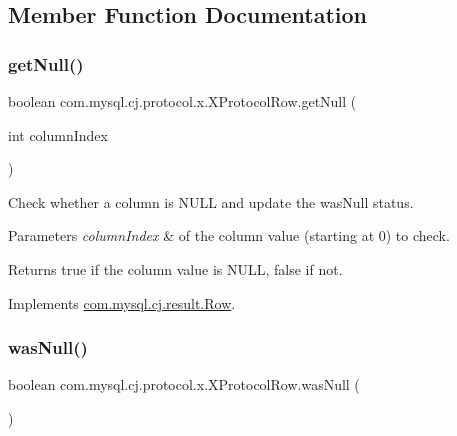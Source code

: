 \subsection{Member Function Documentation}
\mbox{\label{classcom_1_1mysql_1_1cj_1_1protocol_1_1x_1_1_x_protocol_row_adeaa06e6fee80085ce70902ed77ce16a}} 
\subsubsection{\texorpdfstring{get\+Null()}{getNull()}}
{\footnotesize\ttfamily boolean com.\+mysql.\+cj.\+protocol.\+x.\+X\+Protocol\+Row.\+get\+Null (\begin{DoxyParamCaption}\item[{int}]{column\+Index }\end{DoxyParamCaption})}

Check whether a column is N\+U\+LL and update the \textquotesingle{}was\+Null\textquotesingle{} status.


\begin{DoxyParams}{Parameters}
{\em column\+Index} & of the column value (starting at 0) to check.\\
\hline
\end{DoxyParams}
\begin{DoxyReturn}{Returns}
true if the column value is N\+U\+LL, false if not. 
\end{DoxyReturn}


Implements \mbox{\hyperlink{interfacecom_1_1mysql_1_1cj_1_1result_1_1_row_aaf07357d53c30067dfa87183a1e60a18}{com.\+mysql.\+cj.\+result.\+Row}}.

\mbox{\label{classcom_1_1mysql_1_1cj_1_1protocol_1_1x_1_1_x_protocol_row_ae6fd328d9a5ac92bdbb910fb9c8c043a}} 
\subsubsection{\texorpdfstring{was\+Null()}{wasNull()}}
{\footnotesize\ttfamily boolean com.\+mysql.\+cj.\+protocol.\+x.\+X\+Protocol\+Row.\+was\+Null (\begin{DoxyParamCaption}{ }\end{DoxyParamCaption})}

